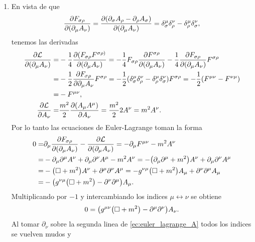 \documentclass{article}
\begin{document}
\begin{enumerate}[1)]
\item En vista de que
\begin{equation}
\pdv{F_{\sigma\rho}}{(\partial_\mu A_\nu)}=\pdv{(\partial_\sigma A_\rho-\partial_\rho A_\sigma)}{(\partial_\mu A_\nu)}=\delta_\sigma^\mu\delta_\rho^\nu-\delta_\rho^\mu\delta_\sigma^\nu,
\end{equation}
tenemos las derivadas
\begin{align}
\begin{split}
\pdv{\mathcal{L}}{(\partial_\mu A_\nu)}=&-\frac{1}{4}\pdv{(F_{\sigma\rho}F^{\sigma\rho)}}{(\partial_\mu A_\nu)}=-\frac{1}{4}F_{\sigma\rho}\pdv{F^{\sigma\rho}}{(\partial_\mu A_\nu)}-\frac{1}{4}\pdv{F_{\sigma\rho}}{(\partial_\mu A_\nu)}F^{\sigma\rho}\\
=&-\frac{1}{2}\pdv{F_{\sigma\rho}}{\partial_\mu A_\nu}F^{\sigma\rho}=-\frac{1}{2}(\delta_\sigma^\mu\delta_\rho^\nu-\delta_\rho^\mu\delta_\sigma^\nu)F^{\sigma\rho}=-\frac{1}{2}(F^{\mu\nu}-F^{\nu\mu})\\
=&-F^{\mu\nu},\\
\pdv{\mathcal{L}}{A_\nu}=&\frac{m^2}{2}\pdv{(A_\mu A^\mu)}{A_\nu}=\frac{m^2}{2}2A^\nu=m^2 A^\nu.
\end{split}
\end{align}
Por lo tanto las ecuaciones de Euler-Lagrange toman la forma
\begin{align}\label{ec:euler_lagrange_A}
\begin{split}
0=&\partial_\mu\pdv{F_{\sigma\rho}}{(\partial_\mu A_\nu)}-\pdv{\mathcal{L}}{(\partial_\mu A_\nu)}=-\partial_\mu F^{\mu\nu}-m^2 A^\nu\\
=&-\partial_\mu\partial^\mu A^\nu+\partial_\mu\partial^\nu A^\mu-m^2 A^\nu=-\qty(\partial_\mu\partial^\mu+m^2)A^\nu+\partial_\mu\partial^\nu A^\mu\\
=&-\qty(\Box+m^2)A^\nu+\partial^\mu\partial^\nu A^\mu=-g^{\nu\mu}\qty(\Box+m^2)A_\mu+\partial^\nu\partial^\mu A_\mu\\
=&-\qty(g^{\nu\mu}\qty(\Box+m^2)-\partial^\nu\partial^\mu)A_\mu.
\end{split}
\end{align}
Multiplicando por $-1$ y intercambiando los indices $\mu\leftrightarrow\nu$ se obtiene
\begin{equation}\label{ec:solucion_5}
0=\qty(g^{\mu\nu}\qty(\Box+m^2)-\partial^\mu\partial^\nu)A_\nu.
\end{equation}
Al tomar $\partial_\nu$ sobre la segunda linea de \eqref{ec:euler_lagrange_A} todos los indices se vuelven mudos y 
\begin{align}

\end{align}
\end{enumerate}
\end{document}
